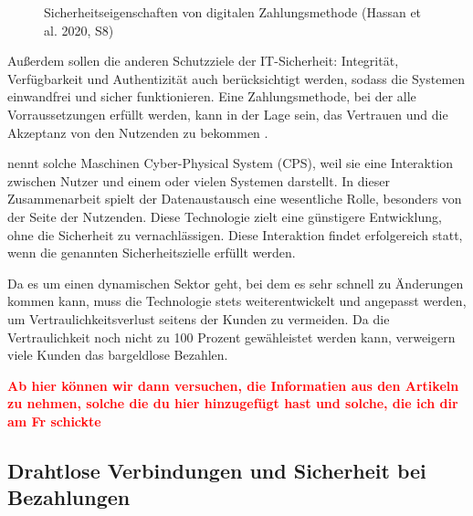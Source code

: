 \vfill
\begin{figure}[htb]
    \caption{Sicherheitseigenschaften von digitalen Zahlungsmethode (Hassan et al. 2020, S8)}
    \label{fig:refark_HARE}
\end{figure}
\vfill

Außerdem sollen die anderen Schutzziele der IT-Sicherheit: Integrität, Verfügbarkeit und
Authentizität auch berücksichtigt werden, sodass die Systemen einwandfrei und sicher funktionieren.
Eine Zahlungsmethode, bei der alle Vorraussetzungen erfüllt werden, kann in der Lage sein, das Vertrauen und 
die Akzeptanz von den Nutzenden zu bekommen \cite{refart:HARE}. 


\cite{inbook:MHNS} nennt solche Maschinen Cyber-Physical System (CPS), weil sie eine Interaktion zwischen 
Nutzer und einem oder vielen Systemen darstellt. In dieser Zusammenarbeit spielt der Datenaustausch 
eine wesentliche Rolle, besonders von der Seite der Nutzenden. Diese Technologie zielt eine günstigere 
Entwicklung, ohne die Sicherheit zu vernachlässigen. Diese Interaktion findet erfolgereich statt, 
wenn die genannten Sicherheitszielle erfüllt werden.


Da es um einen dynamischen Sektor geht, bei dem es sehr schnell zu Änderungen kommen kann, \cite{refip:NYRS} 
muss die Technologie stets weiterentwickelt und angepasst werden, um Vertraulichkeitsverlust seitens
der Kunden zu vermeiden. Da die Vertraulichkeit noch nicht zu 100 Prozent gewähleistet werden kann,
verweigern viele Kunden das bargeldlose Bezahlen.

\textbf{\textcolor{red}{Ab hier können wir dann versuchen, die Informatien aus den Artikeln zu nehmen, solche
die du hier hinzugefügt hast und solche, die ich dir am Fr schickte}}

\subsection{Drahtlose Verbindungen und Sicherheit bei Bezahlungen}

